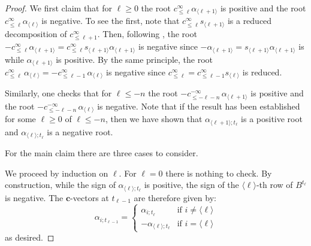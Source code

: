 \documentclass[12pt]{amsart}
\newcommand{\bfc}{\mathbf{c}}
\newcommand{\cv}{\alpha}
\renewcommand{\mod}[1]{\langle {#1} \rangle}
\newcommand{\Zidx}{\ell}
\theoremstyle{remark}
\numberwithin{equation}{section}
\numberwithin{figure}{section}
\begin{document}
\begin{proof}
  We first claim that for $\Zidx \geq 0$ the root $c^\infty_{\leq \Zidx} \alpha_{\mod{\Zidx+1}}$ is positive and the root $c^\infty_{\leq \Zidx} \alpha_{\mod{\Zidx}}$ is negative. To see the first, note that $c^\infty_{\leq \Zidx} s_{\mod{\Zidx+1}}$ is a reduced decomposition of $c^\infty_{\leq \Zidx+1}$. Then, following \cite[VI \S 1.6, Corollary 2 of Proposition 17]{Bou02}, the root $- c^\infty_{\leq \Zidx}\alpha_{\mod{\Zidx+1}} = c^\infty_{\leq \Zidx} s_{\mod{\Zidx+1}} \alpha_{\mod{\Zidx+1}}$ is negative since $-\alpha_{\mod{\Zidx+1}}=s_{\mod{\Zidx+1}} \alpha_{\mod{\Zidx+1}}$ is while $\alpha_{\mod{\Zidx+1}}$ is positive. By the same principle, the root $c^\infty_{\le\Zidx}\, \alpha_{\mod{\Zidx}} = -c^\infty_{\le \Zidx-1}\, \alpha_{\mod{\Zidx}}$ is negative since $c^\infty_{\le\Zidx} = c^\infty_{\le \Zidx-1}s_{\mod{\Zidx}}$ is reduced. 

Similarly, one checks that for $\Zidx \leq -n$ the root $-c^{-\infty}_{\le-\Zidx-n}\, \alpha_{\mod{\Zidx+1}}$ is positive and the root $-c^{-\infty}_{\le-\Zidx-n}\, \alpha_{\mod{\Zidx}}$ is negative. Note that if the result has been established for some $\Zidx \geq 0$ of $\Zidx \leq -n$, then we have shown that $\cv_{\mod{\Zidx+1};t_\Zidx}$ is a positive root and $\cv_{\mod{\Zidx};t_\Zidx}$ is a negative root. 


  For the main claim there are three cases to consider.

  \noindent{\bf Case $-n \leq \Zidx \leq 0$.}
  We proceed by induction on $\Zidx$.
  For $\Zidx=0$ there is nothing to check.
  By construction, while the sign of $\cv_{\mod{\Zidx};t_\Zidx}$ is positive, the sign of the $\mod{\Zidx}$-th row of $B^{t_\Zidx}$ is negative.
  The $\bfc$-vectors at $t_{\Zidx-1}$ are therefore given by:
  \begin{equation*}
    \cv_{i;t_{\Zidx-1}}
    =
    \begin{cases}
      \cv_{i;t_\Zidx} & \text{if $i\neq \mod{\Zidx}$}\\
      -\cv_{\mod{\Zidx};t_\Zidx} & \text{if $i = \mod{\Zidx}$}
    \end{cases}
  \end{equation*}
  as desired.


\end{proof}
\end{document}
